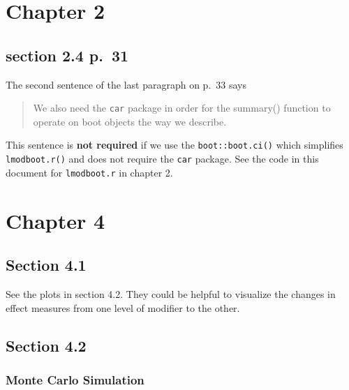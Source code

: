 \documentclass[
]{book}
\theoremstyle{definition}
\theoremstyle{definition}
\theoremstyle{definition}
\theoremstyle{definition}
\theoremstyle{remark}
\begin{document}
\hypertarget{chapter-2-1}{%
\section*{Chapter 2}\label{chapter-2-1}}

\hypertarget{section-2.4-p.-31}{%
\subsection*{section 2.4 p.~31}\label{section-2.4-p.-31}}

The second sentence of the last paragraph on p.~33 says

\begin{quote}
We also need the \texttt{car} package in order for the summary() function to
operate on boot objects the way we describe.
\end{quote}

This sentence is \textbf{not required} if we use the \texttt{boot::boot.ci()}
which simplifies \texttt{lmodboot.r()} and does not require the \texttt{car} package.
See the code in this document for \texttt{lmodboot.r} in chapter 2.

\hypertarget{chapter-4}{%
\section*{Chapter 4}\label{chapter-4}}

\hypertarget{section-4.1}{%
\subsection*{Section 4.1}\label{section-4.1}}

See the plots in section 4.2. They could be helpful to visualize the changes
in effect measures from one level of modifier to the other.

\hypertarget{section-4.2}{%
\subsection*{Section 4.2}\label{section-4.2}}

\hypertarget{monte-carlo-simulation}{%
\subsubsection*{Monte Carlo Simulation}\label{monte-carlo-simulation}}
\end{document}
